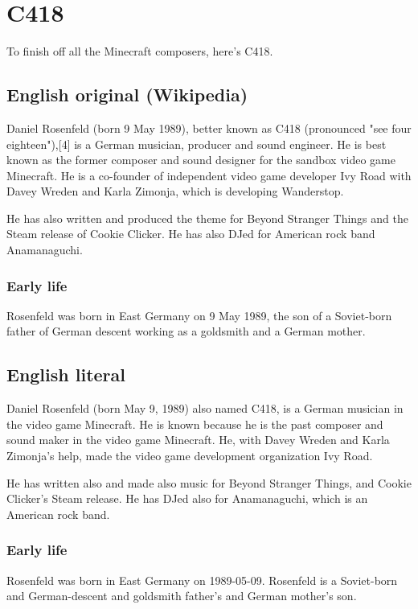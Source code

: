 

\section{C418}
To finish off all the Minecraft composers, here's C418.

\subsection*{English original (Wikipedia)}
Daniel Rosenfeld (born 9 May 1989), better known as C418 (pronounced "see four eighteen"),[4] is a German musician, producer and sound engineer.
He is best known as the former composer and sound designer for the sandbox video game Minecraft.
He is a co-founder of independent video game developer Ivy Road with Davey Wreden and Karla Zimonja, which is developing Wanderstop. 

He has also written and produced the theme for Beyond Stranger Things and the Steam release of Cookie Clicker.
He has also DJed for American rock band Anamanaguchi. 

\subsubsection*{Early life}
Rosenfeld was born in East Germany on 9 May 1989, the son of a Soviet-born father of German descent working as a goldsmith and a German mother.

\subsection*{English literal}
Daniel Rosenfeld (born May 9, 1989) also named C418, is a German musician in the video game Minecraft.
He is known because he is the past composer and sound maker in the video game Minecraft.
He, with Davey Wreden and Karla Zimonja's help, made the video game development organization Ivy Road.

He has written also and made also music for Beyond Stranger Things, and Cookie Clicker's Steam release.
He has DJed also for Anamanaguchi, which is an American rock band.

\subsubsection*{Early life}
Rosenfeld was born in East Germany on 1989-05-09.
Rosenfeld is a Soviet-born and German-descent and goldsmith father's and German mother's son.


